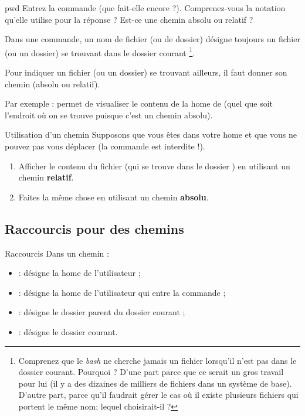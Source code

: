 \documentclass[a4paper,11pt]{style-esi/td}
\begin{document}
		\begin{Exercice}{pwd}
			Entrez la commande  (que fait-elle encore ?). 
			Comprenez-vous la notation qu'elle utilise pour la réponse ?
			Est-ce une chemin absolu ou relatif ?
		\end{Exercice}

		Dans une commande, un nom de fichier (ou de dossier)
		désigne toujours un fichier (ou un dossier) se trouvant
		dans le dossier courant%
		\footnote{%
			Comprenez que le \emph{bash} ne cherche jamais un fichier
			lorsqu'il n'est pas dans le dossier courant. 
			Pourquoi ? D'une part parce que ce serait un gros travail pour lui 
			(il y a des dizaines de milliers de fichiers dans un système de base). 
			D'autre part, parce qu'il faudrait gérer le cas 
			où il existe plusieurs fichiers qui portent le même nom; 
			lequel choisirait-il ?
		}.

		Pour indiquer un fichier (ou un dossier) se trouvant ailleurs,
		il faut donner son chemin (absolu ou relatif).

		Par exemple : 
		permet de visualiser le contenu de la home de 
		(quel que soit l'endroit où on se trouve puisque c'est un chemin absolu).
		
		\begin{Exercice}{Utilisation d'un chemin}
			Supposons que vous êtes dans votre home 
			et que vous ne pouvez pas vous déplacer 
			(la commande  est interdite !).
			\begin{enumerate}
			\item Afficher le contenu du fichier 
				(qui se trouve dans le dossier )
				en utilisant un chemin \textbf{relatif}.
			\item Faites la même chose 
				en utilisant un chemin \textbf{absolu}.
			\end{enumerate}
		\end{Exercice}

	\subsection{Raccourcis pour des chemins}

		\begin{theorie}{Raccourcis}
			Dans un chemin :
			\begin{itemize}
			\item {} : désigne la home de l'utilisateur  ;
			\item \samp{\textasciitilde{}} : désigne la home de l'utilisateur qui entre la commande ;
			\item {} : désigne le dossier parent du dossier courant ;
			\item {} : désigne le dossier courant.
			\end{itemize}
		\end{theorie}
\end{document}
